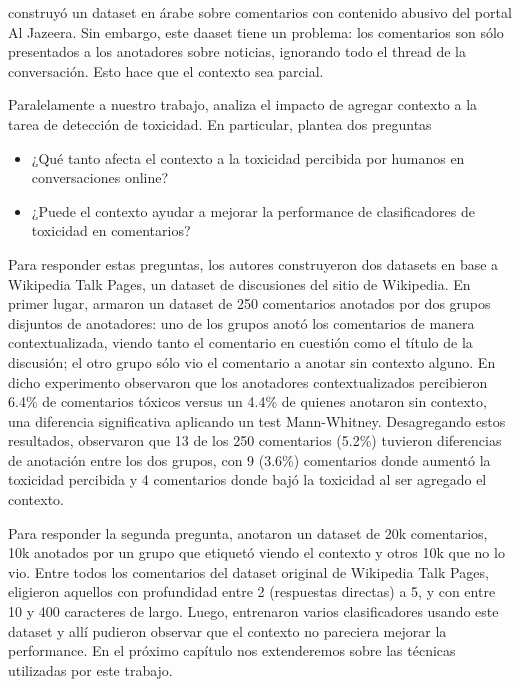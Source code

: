 \citet{mubarak-etal-2017-abusive} construyó un dataset en árabe sobre comentarios con contenido abusivo del portal Al Jazeera. Sin embargo, este daaset tiene un problema: los comentarios son sólo presentados a los anotadores sobre noticias, ignorando todo el thread de la conversación. Esto hace que el contexto sea parcial.


Paralelamente a nuestro trabajo, \citet{pavlopoulos2020toxicity} analiza el impacto de agregar contexto a la tarea de detección de toxicidad. En particular, plantea dos preguntas

\begin{itemize}
    \item ¿Qué tanto afecta el contexto a la toxicidad percibida por humanos en conversaciones online?
    \item ¿Puede el contexto ayudar a mejorar la performance de clasificadores de toxicidad en comentarios?
\end{itemize}

Para responder estas preguntas, los autores construyeron dos datasets en base a Wikipedia Talk Pages\cite{hua-etal-2018-wikiconv}, un dataset de discusiones del sitio de Wikipedia. En primer lugar, armaron un dataset de 250 comentarios anotados por dos grupos disjuntos de anotadores: uno de los grupos anotó los comentarios de manera contextualizada, viendo tanto el comentario en cuestión como el título de la discusión; el otro grupo sólo vio el comentario a anotar sin contexto alguno. En dicho experimento observaron que los anotadores contextualizados percibieron 6.4\% de comentarios tóxicos versus un 4.4\% de quienes anotaron sin contexto, una diferencia significativa aplicando un test Mann-Whitney. Desagregando estos resultados, observaron que 13 de los 250 comentarios (5.2\%) tuvieron diferencias de anotación entre los dos grupos, con 9 (3.6\%) comentarios donde aumentó la toxicidad percibida y 4 comentarios donde bajó la toxicidad al ser agregado el contexto.

Para responder la segunda pregunta, anotaron un dataset de 20k comentarios, 10k anotados por un grupo que etiquetó viendo el contexto y otros 10k que no lo vio. Entre todos los comentarios del dataset original de Wikipedia Talk Pages, eligieron aquellos con profundidad entre 2 (respuestas directas) a 5, y con entre 10 y 400 caracteres de largo. Luego, entrenaron varios clasificadores usando este dataset y allí pudieron observar que el contexto no pareciera mejorar la performance. En el próximo capítulo nos extenderemos sobre las técnicas utilizadas por este trabajo.

